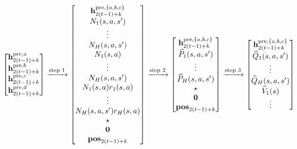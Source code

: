 \begin{align}
    \begin{bmatrix}
    {\mathbf h}_{2(t-1)+k}^{{\mathrm{pre}},{a}} \\  {\mathbf h}_{2(t-1)+k}^{{\mathrm{pre}},{b}}\\  {\mathbf h}_{2(t-1)+k}^{{\mathrm{pre}},{c}}\\   {\mathbf h}_{2(t-1)+k}^{{\mathrm{pre}},{d}}
\end{bmatrix}&
\xrightarrow{\text{step 1}}
   \begin{bmatrix}
    {\mathbf h}_{2(t-1)+k}^{{\mathrm{pre}},\{{a},{b},{c}\}} \\
        {N}_{1}({s},{a},{s}') \\ \vdots \\
         {N}_{{H}}({s},{a},{s}') 
         \\ 
        {N}_{1}({s},{a}) \\\vdots\\
        {N}_{{H}}({s},{a},{s}') 
         \\  
         {N}_{1}({s},{a}){r}_{1}({s},{a}) \\\vdots\\
        {N}_{{H}}({s},{a},{s}') {r}_{{H}}({s},{a})
         \\ 
         \star\\ {\mathbf 0} \\{\mathbf{pos}}_{2(t-1)+k}
\end{bmatrix}
\xrightarrow{\text{step 2}}
\begin{bmatrix}
    {\mathbf h}_{2(t-1)+k}^{{\mathrm{pre}},\{{a},{b},{c}\}} \\
         \widehat{P}_{1}({s},{a},{s}') \\ \vdots \\
         \widehat{P}_{{H}}({s},{a},{s}')  \\ \star
        \\ {\mathbf 0} \\{\mathbf{pos}}_{2(t-1)+k}
\end{bmatrix}
\xrightarrow{\text{step 3}}
\begin{bmatrix}
    {\mathbf h}_{2(t-1)+k}^{{\mathrm{pre}},\{{a},{b},{c}\}} \\
         {\widehat{{Q}}}_{1}({s},{a},{s}') \\ \vdots \\
         {\widehat{{Q}}}_{{H}}({s},{a},{s}')  \\ 
           {\widehat{{{V}}}}_{1}({s}) \\ \vdots \\

\end{bmatrix}
\end{align}
